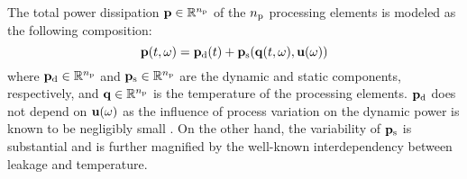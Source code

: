 The total power dissipation $\mathbf{p} \in \mathbb{R}^{n_\text{p}}$ of the ${n_\text{p}}$ processing elements is modeled as the following composition:
\begin{equation} \elabel{power-model}
  \vP(\t, \o) = \vP_\dynamic(\t) + \vP_\static(\vQ(\t, \o), \vU(\o))
\end{equation}
where $\mathbf{p}_{\text{d}} \in \mathbb{R}^{n_\text{p}}$ and $\mathbf{p}_{\text{s}} \in \mathbb{R}^{n_\text{p}}$ are the dynamic and static components, respectively, and $\mathbf{q} \in \mathbb{R}^{n_\text{p}}$ is the temperature of the processing elements.
$\mathbf{p}_{\text{d}}$ does not depend on $\mathbf{u}(\omega)$ as the influence of process variation on the dynamic power is known to be negligibly small \cite{srivastava2010}.
On the other hand, the variability of $\mathbf{p}_{\text{s}}$ is substantial and is further magnified by the well-known interdependency between leakage and temperature.
